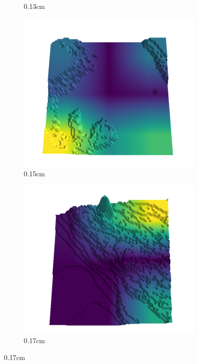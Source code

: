 \documentclass[../document.tex]{subfiles}
\begin{document}
\begin{figure}[H]
\begin{subfigure}[b]{0.192\linewidth}
    \caption{0.13cm}
    \label{fig : quarry-worst-17}
    \end{subfigure}
    \begin{subfigure}[b]{0.192\linewidth}
    \includegraphics[width=\linewidth]{../img/5/quarry/worst/15-patch-3d-majavi-colormap-180.png}
    \caption{0.15cm}
    \label{fig : quarry-worst-18}
    \end{subfigure}
    \begin{subfigure}[b]{0.192\linewidth}
    \includegraphics[width=\linewidth]{../img/5/quarry/worst/17-patch-3d-majavi-colormap-190.png}
    \caption{0.17cm}
    \label{fig : quarry-worst-19}
    \end{subfigure}
    \label{fig : quarry-worst}
    \end{figure}
\end{document}
